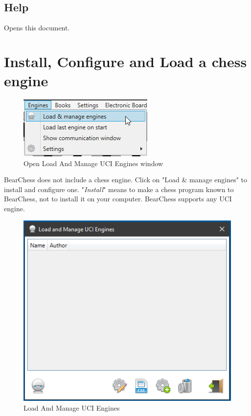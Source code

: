 \documentclass[11pt,a4paper]{article}
\begin{document}
\subsection{Help}
Opens this document.

\section{Install, Configure and Load a chess engine} \label{loadEngines}

\begin{figure}[H]
	\centering
	\includegraphics[scale=1.0]{LoadEngine.png}
	\caption{Open Load And Manage UCI Engines window}
	\label{fig:LoadEngine}
\end{figure}
BearChess does not include a chess engine. Click on "Load \& manage engines" to install and configure one. "\textit{Install}" means to make a chess program known to BearChess, not to install it on your computer. BearChess supports any UCI engine.\\
\begin{figure}[H]
	\centering
	\includegraphics[scale=1.0]{LoadManageEngine1.png}
	\caption{Load And Manage UCI Engines}
	\label{fig:LoadManageEngine1}
\end{figure}
\end{document}
